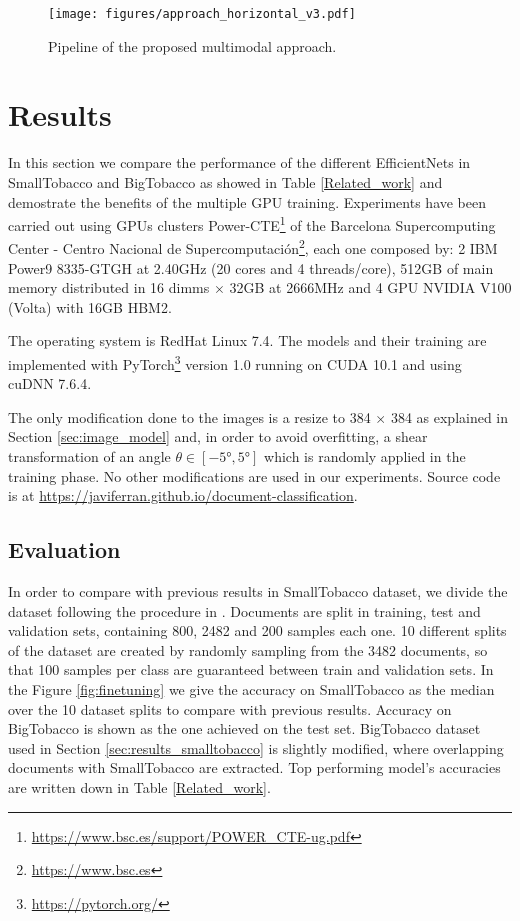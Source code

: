 \documentclass[runningheads]{llncs}
\begin{document}
\begin{figure}[H]
	\begin{centering}
	\texttt{[image: figures/approach\_horizontal\_v3.pdf]}
	\caption{Pipeline of the proposed multimodal approach.}
	\label{fig:approach}
	\end{centering}
\end{figure}

\section{Results}\label{results}

In this section we compare the performance of the different EfficientNets in SmallTobacco and BigTobacco as showed in Table \ref{Related_work} and demostrate the benefits of the multiple GPU training. Experiments have been carried out using GPUs clusters Power-CTE\footnote{\url{https://www.bsc.es/support/POWER_CTE-ug.pdf}} of the Barcelona Supercomputing Center - Centro Nacional de Supercomputación\footnote{\url{https://www.bsc.es}}, each one composed by:
2 IBM Power9 8335-GTGH at 2.40GHz (20 cores and 4 threads/core), 512GB of main memory distributed in 16 dimms $\times$ 32GB at 2666MHz and 4 GPU NVIDIA V100 (Volta) with 16GB HBM2.

The operating system is RedHat Linux 7.4. The models and their training are implemented with PyTorch\footnote{\url{https://pytorch.org/}} version 1.0 running on CUDA 10.1 and using cuDNN 7.6.4.

The only modification done to the images  is a resize to 384 $\times$ 384 as explained in Section \ref{sec:image_model} and, in order to avoid overfitting, a shear transformation of an angle $\theta \in [\ang{-5}, \ang{5}]$ \cite{CNNs_analysis} which is randomly applied in the training phase. No other modifications are used in our experiments. Source code is at \url{https://javiferran.github.io/document-classification}.

\subsection{Evaluation}
In order to compare with previous results in SmallTobacco dataset, we divide the dataset following the procedure in \cite{tobacco3482}. Documents are split in training, test and validation sets, containing 800, 2482 and 200 samples each one. 10 different splits of the dataset are created by randomly sampling from the 3482 documents, so that 100 samples per class are guaranteed between train and validation sets. In the Figure \ref{fig:finetuning} we give the accuracy on SmallTobacco as the median over the 10 dataset splits to compare with previous results. Accuracy on BigTobacco is shown as the one achieved on the test set. BigTobacco dataset used in Section \ref{sec:results_smalltobacco} is slightly modified, where overlapping documents with SmallTobacco are extracted. Top performing model's accuracies are written down in Table \ref{Related_work}.
\end{document}
